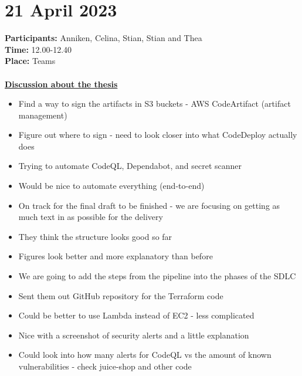 \section{21 April 2023}
\textbf{Participants:} Anniken, Celina, Stian, Stian and Thea\\
\textbf{Time:} 12.00-12.40 \\
\textbf{Place:} Teams
\\~\\
\textbf{\underline{Discussion about the thesis}}
\begin{itemize}
    \item Find a way to sign the artifacts in S3 buckets - AWS CodeArtifact (artifact management)
    \item Figure out where to sign - need to look closer into what CodeDeploy actually does
    \item Trying to automate CodeQL, Dependabot, and secret scanner
    \item Would be nice to automate everything (end-to-end)
    \item On track for the final draft to be finished - we are focusing on getting as much text in as possible for the delivery
    \item They think the structure looks good so far
    \item Figures look better and more explanatory than before
    \item We are going to add the steps from the pipeline into the phases of the SDLC
    \item Sent them out GitHub repository for the Terraform code
    \item Could be better to use Lambda instead of EC2 - less complicated
    \item Nice with a screenshot of security alerts and a little explanation 
    \item Could look into how many alerts for CodeQL vs the amount of known vulnerabilities - check juice-shop and other code
\end{itemize}